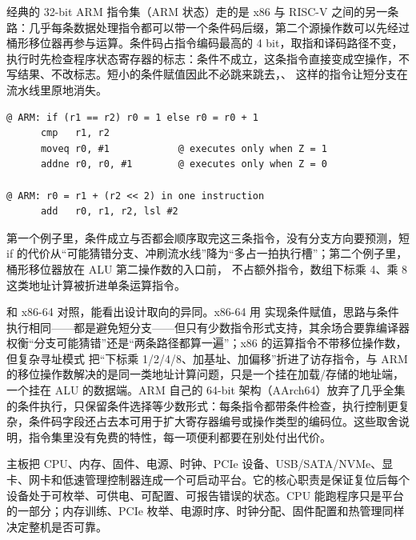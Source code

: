 经典的 32-bit ARM 指令集（ARM 状态）走的是 x86 与 RISC-V 之间的另一条路：几乎每条数据处理指令都可以带一个条件码后缀，第二个源操作数可以先经过桶形移位器再参与运算。条件码占指令编码最高的 4 bit，取指和译码路径不变，执行时先检查程序状态寄存器的标志：条件不成立，这条指令直接变成空操作，不写结果、不改标志。短小的条件赋值因此不必跳来跳去，、 这样的指令让短分支在流水线里原地消失。

\begin{lstlisting}
@ ARM: if (r1 == r2) r0 = 1 else r0 = r0 + 1
      cmp   r1, r2
      moveq r0, #1            @ executes only when Z = 1
      addne r0, r0, #1        @ executes only when Z = 0

@ ARM: r0 = r1 + (r2 << 2) in one instruction
      add   r0, r1, r2, lsl #2
\end{lstlisting}

第一个例子里，条件成立与否都会顺序取完这三条指令，没有分支方向要预测，短 if 的代价从“可能猜错分支、冲刷流水线”降为“多占一拍执行槽”；第二个例子里，桶形移位器放在 ALU 第二操作数的入口前， 不占额外指令，数组下标乘 4、乘 8 这类地址计算被折进单条运算指令。

和 x86-64 对照，能看出设计取向的异同。x86-64 用  实现条件赋值，思路与条件执行相同——都是避免短分支——但只有少数指令形式支持，其余场合要靠编译器权衡“分支可能猜错”还是“两条路径都算一遍”；x86 的运算指令不带移位操作数，但复杂寻址模式  把“下标乘 1/2/4/8、加基址、加偏移”折进了访存指令，与 ARM 的移位操作数解决的是同一类地址计算问题，只是一个挂在加载/存储的地址端，一个挂在 ALU 的数据端。ARM 自己的 64-bit 架构（AArch64）放弃了几乎全集的条件执行，只保留条件选择等少数形式：每条指令都带条件检查，执行控制更复杂，条件码字段还占去本可用于扩大寄存器编号或操作类型的编码位。这些取舍说明，指令集里没有免费的特性，每一项便利都要在别处付出代价。

主板把 CPU、内存、固件、电源、时钟、PCIe 设备、USB/SATA/NVMe、显卡、网卡和低速管理控制器连成一个可启动平台。它的核心职责是保证复位后每个设备处于可枚举、可供电、可配置、可报告错误的状态。CPU 能跑程序只是平台的一部分；内存训练、PCIe 枚举、电源时序、时钟分配、固件配置和热管理同样决定整机是否可靠。

